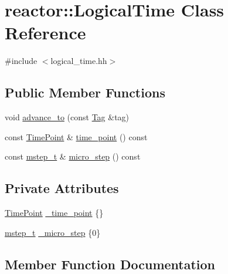 \hypertarget{classreactor_1_1LogicalTime}{}\section{reactor\+:\+:Logical\+Time Class Reference}
\label{classreactor_1_1LogicalTime}


{\ttfamily \#include $<$logical\+\_\+time.\+hh$>$}

\subsection*{Public Member Functions}
\begin{DoxyCompactItemize}
\item 
void \hyperlink{classreactor_1_1LogicalTime_a50fa399e89e28bece4a1198efe626110}{advance\+\_\+to} (const \hyperlink{classreactor_1_1Tag}{Tag} \&tag)
\item 
const \hyperlink{namespacereactor_ad950f8d1a46612500286a4af0f167080}{Time\+Point} \& \hyperlink{classreactor_1_1LogicalTime_a94567626de1241161edfb41c34d6b09e}{time\+\_\+point} () const
\item 
const \hyperlink{namespacereactor_aaea1189d617982457b74127ba74a7340}{mstep\+\_\+t} \& \hyperlink{classreactor_1_1LogicalTime_a59d2ded3742c8bcec0d9af22a45bd133}{micro\+\_\+step} () const
\end{DoxyCompactItemize}
\subsection*{Private Attributes}
\begin{DoxyCompactItemize}
\item 
\hyperlink{namespacereactor_ad950f8d1a46612500286a4af0f167080}{Time\+Point} \hyperlink{classreactor_1_1LogicalTime_a00ea2389e8dd656986c559690343d963}{\+\_\+time\+\_\+point} \{\}
\item 
\hyperlink{namespacereactor_aaea1189d617982457b74127ba74a7340}{mstep\+\_\+t} \hyperlink{classreactor_1_1LogicalTime_a54b9d7e8cd2af3523b92efbbac1969e9}{\+\_\+micro\+\_\+step} \{0\}
\end{DoxyCompactItemize}


\subsection{Member Function Documentation}
\mbox{\label{classreactor_1_1LogicalTime_a50fa399e89e28bece4a1198efe626110}} 
